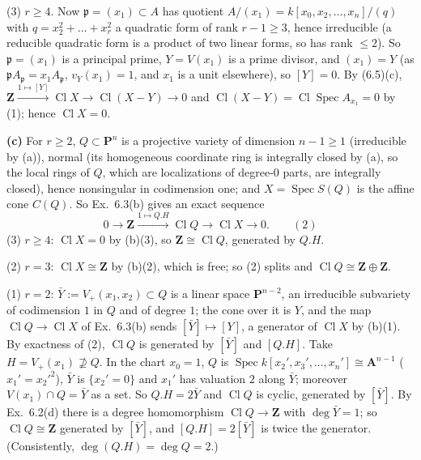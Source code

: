 \documentclass[11pt]{article}
\begin{document}
(3) $r\ge4$. Now $\mathfrak p=(x_1)\subset A$ has quotient $A/(x_1)=k[x_0,x_2,\dots,x_n]/(q)$ with $q=x_2^2+\dots+x_r^2$ a quadratic form of rank $r-1\ge3$, hence irreducible (a reducible quadratic form is a product of two linear forms, so has rank $\le2$). So $\mathfrak p=(x_1)$ is a principal prime, $Y=V(x_1)$ is a prime divisor, and $(x_1)=Y$ (as $\mathfrak pA_{\mathfrak p}=x_1A_{\mathfrak p}$, $v_Y(x_1)=1$, and $x_1$ is a unit elsewhere), so $[Y]=0$. By (6.5)(c), $\mathbf Z\xrightarrow{1\mapsto[Y]}\operatorname{Cl}X\to\operatorname{Cl}(X-Y)\to0$ and $\operatorname{Cl}(X-Y)=\operatorname{Cl}\operatorname{Spec}A_{x_1}=0$ by (1); hence $\operatorname{Cl}X=0$.

\textbf{(c)} For $r\ge2$, $Q\subset\mathbf P^n$ is a projective variety of dimension $n-1\ge1$ (irreducible by (a)), normal (its homogeneous coordinate ring is integrally closed by (a), so the local rings of $Q$, which are localizations of degree-$0$ parts, are integrally closed), hence nonsingular in codimension one; and $X=\operatorname{Spec}S(Q)$ is the affine cone $C(Q)$. So Ex.~6.3(b) gives an exact sequence
\[
0\to\mathbf Z\xrightarrow{1\mapsto Q.H}\operatorname{Cl}Q\to\operatorname{Cl}X\to0.\qquad(2)
\]
(3) $r\ge4$: $\operatorname{Cl}X=0$ by (b)(3), so $\mathbf Z\cong\operatorname{Cl}Q$, generated by $Q.H$.

(2) $r=3$: $\operatorname{Cl}X\cong\mathbf Z$ by (b)(2), which is free; so (2) splits and $\operatorname{Cl}Q\cong\mathbf Z\oplus\mathbf Z$.

(1) $r=2$: $\bar Y:=V_+(x_1,x_2)\subset Q$ is a linear space $\mathbf P^{n-2}$, an irreducible subvariety of codimension $1$ in $Q$ and of degree $1$; the cone over it is $Y$, and the map $\operatorname{Cl}Q\to\operatorname{Cl}X$ of Ex.~6.3(b) sends $[\bar Y]\mapsto[Y]$, a generator of $\operatorname{Cl}X$ by (b)(1). By exactness of (2), $\operatorname{Cl}Q$ is generated by $[\bar Y]$ and $[Q.H]$. Take $H=V_+(x_1)\not\supseteq Q$. In the chart $x_0=1$, $Q$ is $\operatorname{Spec}k[x_2',x_3',\dots,x_n']\cong\mathbf A^{n-1}$ ($x_1'=x_2'^2$), $\bar Y$ is $\{x_2'=0\}$ and $x_1'$ has valuation $2$ along $\bar Y$; moreover $V(x_1)\cap Q=\bar Y$ as a set. So $Q.H=2\bar Y$ and $\operatorname{Cl}Q$ is cyclic, generated by $[\bar Y]$. By Ex.~6.2(d) there is a degree homomorphism $\operatorname{Cl}Q\to\mathbf Z$ with $\deg\bar Y=1$; so $\operatorname{Cl}Q\cong\mathbf Z$ generated by $[\bar Y]$, and $[Q.H]=2[\bar Y]$ is twice the generator. (Consistently, $\deg(Q.H)=\deg Q=2$.)
\end{document}

